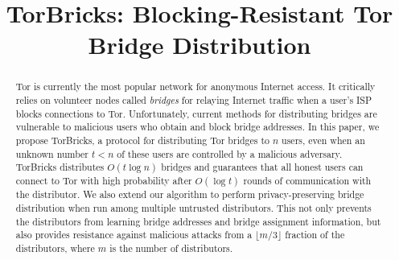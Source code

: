 \documentclass[USenglish,oneside,twocolumn]{article}
\newcommand{\bricks}{}
\def\bricks/{\textsf{\sfsize \mbox{TorBricks}}}
\newcommand{\sfsize}{\fontsize{0.68\baselineskip}{0.68\baselineskip}\selectfont}
\begin{document}
\sloppy

\title{\LARGE TorBricks: Blocking-Resistant Tor Bridge Distribution}

\begin{abstract}
{%
Tor is currently the most popular network for anonymous Internet access. It critically relies on volunteer nodes called \emph{bridges} for relaying Internet traffic when a user's ISP blocks connections to Tor. 
Unfortunately, current methods for distributing bridges are vulnerable to malicious users who obtain and block bridge addresses.
In this paper, we propose \bricks/, a protocol for distributing Tor bridges to $n$ users, even when an unknown number ${t < n}$ of these users are controlled by a malicious adversary. \bricks/ distributes $O(t\log{n})$ bridges and guarantees that all honest users can connect to Tor with high probability after $O(\log{t})$ rounds of communication with the distributor. %
\newline We also extend our algorithm to perform privacy-preserving bridge distribution when run among multiple untrusted distributors. This not only prevents the distributors from learning bridge addresses and bridge assignment information, but also provides resistance against malicious attacks from a $\lfloor m/3 \rfloor$ fraction of the distributors, where $m$ is the number of distributors.}
\end{abstract}

\maketitle
\end{document}

